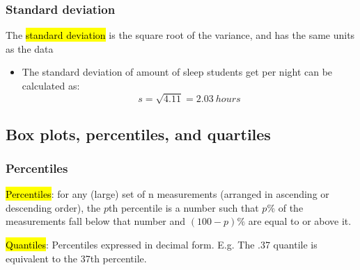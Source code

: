 \documentclass[slidestop,compress,mathserif]{beamer}
\makeatletter
\def\chpii@path{../../Chp 2}
\makeatother
\begin{document}

\begin{frame}
\frametitle{Standard deviation}

The \hl{standard deviation} is the square root of the variance, and has the same units as the data

\formula{
\[ s = \sqrt{s^2} \]
}

\pause

{
\begin{itemize}

\item The standard deviation of amount of sleep students get per night can be calculated as:
\[ s = \sqrt{4.11} = 2.03~hours\]

\end{itemize}
}
{
}

\end{frame}


\subsection{Box plots, percentiles, and quartiles}

\begin{frame}
\frametitle{Percentiles}

\hl{Percentiles}: for any (large) set of n measurements (arranged in ascending or descending order), the $p$th percentile is a number such that $p\%$ of the measurements fall below that number and $(100-p)\%$ are equal to or above it.

\hl{Quantiles}: Percentiles expressed in decimal form.  E.g. The .37 quantile is equivalent to the 37th percentile.

\end{frame}
\end{document}

